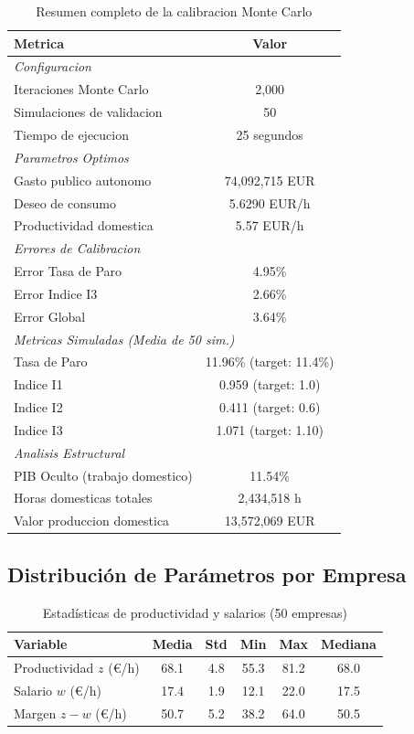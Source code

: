 \begin{table}[h]
\centering
\caption{Resumen completo de la calibracion Monte Carlo}
\begin{tabular}{lc}
\toprule
\textbf{Metrica} & \textbf{Valor} \\
\midrule
\multicolumn{2}{l}{\textit{Configuracion}} \\
Iteraciones Monte Carlo & 2,000 \\
Simulaciones de validacion & 50 \\
Tiempo de ejecucion & 25 segundos \\
\midrule
\multicolumn{2}{l}{\textit{Parametros Optimos}} \\
Gasto publico autonomo & 74,092,715 EUR \\
Deseo de consumo & 5.6290 EUR/h \\
Productividad domestica & 5.57 EUR/h \\
\midrule
\multicolumn{2}{l}{\textit{Errores de Calibracion}} \\
Error Tasa de Paro & 4.95\% \\
Error Indice I3 & 2.66\% \\
Error Global & 3.64\% \\
\midrule
\multicolumn{2}{l}{\textit{Metricas Simuladas (Media de 50 sim.)}} \\
Tasa de Paro & 11.96\% (target: 11.4\%) \\
Indice I1 & 0.959 (target: 1.0) \\
Indice I2 & 0.411 (target: 0.6) \\
Indice I3 & 1.071 (target: 1.10) \\
\midrule
\multicolumn{2}{l}{\textit{Analisis Estructural}} \\
PIB Oculto (trabajo domestico) & 11.54\% \\
Horas domesticas totales & 2,434,518 h \\
Valor produccion domestica & 13,572,069 EUR \\
\bottomrule
\end{tabular}
\end{table}

\subsection{Distribución de Parámetros por Empresa}

\begin{table}[h]
\centering
\caption{Estadísticas de productividad y salarios (50 empresas)}
\begin{tabular}{lccccc}
\toprule
\textbf{Variable} & \textbf{Media} & \textbf{Std} & \textbf{Min} & \textbf{Max} & \textbf{Mediana} \\
\midrule
Productividad $z$ (€/h) & 68.1 & 4.8 & 55.3 & 81.2 & 68.0 \\
Salario $w$ (€/h) & 17.4 & 1.9 & 12.1 & 22.0 & 17.5 \\
Margen $z-w$ (€/h) & 50.7 & 5.2 & 38.2 & 64.0 & 50.5 \\
\bottomrule
\end{tabular}
\end{table}


